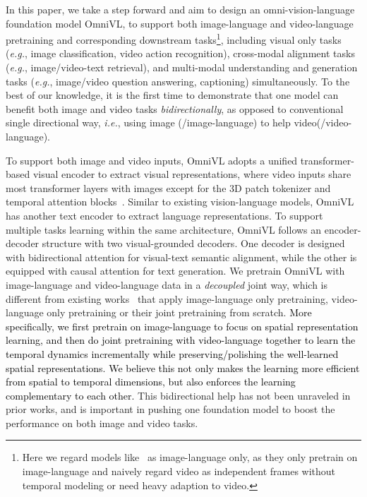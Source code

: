 \documentclass{article}
\makeatletter
\newcommand*{\system}{OmniVL\@\xspace}
\newcommand*{\eg}{\emph{e.g.}\@\xspace}
\newcommand*{\ie}{\emph{i.e.}\@\xspace}
\newcommand{\red}[1]{\textcolor{black}{#1}}
\makeatother
\begin{document}
In this paper, we take a step forward and aim to design an omni-vision-language foundation model \system, to support both image-language and video-language pretraining and corresponding downstream tasks\footnote{\noindent Here we regard models like~\cite{yuan2021florence,yu2022coca} as image-language only, as they only pretrain on image-language and naively regard video as independent frames without temporal modeling or need heavy adaption to video.}, including visual only tasks (\eg, image classification, video action recognition), cross-modal alignment tasks (\eg, image/video-text retrieval), and multi-modal understanding and generation tasks (\eg, image/video question answering, captioning) simultaneously. To the best of our knowledge, it is the first time to demonstrate that one model can benefit both image and video tasks \emph{bidirectionally}, as opposed to conventional single directional way, \ie, using image (/image-language) to help video(/video-language).

To support both image and video inputs, \system adopts a unified transformer-based visual encoder to extract visual representations, where video inputs share most transformer layers with images except for the 3D patch tokenizer and temporal attention blocks~\cite{gberta_2021_ICML}. Similar to existing vision-language models, \system has another text encoder to extract language representations. To support multiple tasks learning within the same architecture, \system follows an encoder-decoder structure with two visual-grounded decoders. One decoder is designed with bidirectional attention for visual-text semantic alignment, while the other is equipped with causal attention for text generation. We pretrain \system with image-language and video-language data in a \emph{decoupled} joint way, which is different from existing works~\cite{li2022blip,yu2022coca,yuan2021florence,radford2021learning,zellers2021merlot} that apply image-language only pretraining, video-language only pretraining or their joint pretraining from scratch. \red{More specifically, we first pretrain on image-language to focus on spatial representation learning, and then do joint pretraining with video-language together to learn the temporal dynamics incrementally while preserving/polishing the well-learned spatial representations. We believe this not only makes the learning more efficient from spatial to temporal dimensions, but also enforces the learning complementary to each other.} This bidirectional help has not been unraveled in prior works, and is important in pushing one foundation model to boost the performance on both image and video tasks.
\end{document}
